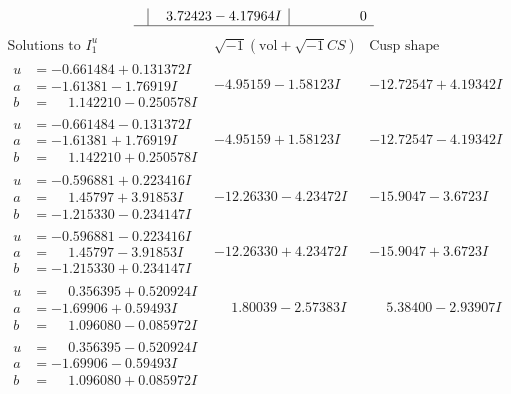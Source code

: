 \documentclass[1p]{elsarticle_modified}
\theoremstyle{definition}
\newcommand{\I}{\sqrt{-1}}
\begin{document}
$$\begin{array}{c|c|c}
 & \phantom{-}3.72423 - 4.17964 I & \phantom{-0.000000 } 0\\
 \hline 
 \end{array}$$\newpage$$\begin{array}{c|c|c}  
\text{Solutions to }I^u_{1}& \I (\text{vol} + \sqrt{-1}CS) & \text{Cusp shape}\\
 \hline 
\begin{aligned}
u &= -0.661484 + 0.131372 I \\
a &= -1.61381 - 1.76919 I \\
b &= \phantom{-}1.142210 - 0.250578 I\end{aligned}
 & -4.95159 - 1.58123 I & -12.72547 + 4.19342 I \\ \hline\begin{aligned}
u &= -0.661484 - 0.131372 I \\
a &= -1.61381 + 1.76919 I \\
b &= \phantom{-}1.142210 + 0.250578 I\end{aligned}
 & -4.95159 + 1.58123 I & -12.72547 - 4.19342 I \\ \hline\begin{aligned}
u &= -0.596881 + 0.223416 I \\
a &= \phantom{-}1.45797 + 3.91853 I \\
b &= -1.215330 - 0.234147 I\end{aligned}
 & -12.26330 - 4.23472 I & -15.9047 - 3.6723 I \\ \hline\begin{aligned}
u &= -0.596881 - 0.223416 I \\
a &= \phantom{-}1.45797 - 3.91853 I \\
b &= -1.215330 + 0.234147 I\end{aligned}
 & -12.26330 + 4.23472 I & -15.9047 + 3.6723 I \\ \hline\begin{aligned}
u &= \phantom{-}0.356395 + 0.520924 I \\
a &= -1.69906 + 0.59493 I \\
b &= \phantom{-}1.096080 - 0.085972 I\end{aligned}
 & \phantom{-}1.80039 - 2.57383 I & \phantom{-}5.38400 - 2.93907 I \\ \hline\begin{aligned}
u &= \phantom{-}0.356395 - 0.520924 I \\
a &= -1.69906 - 0.59493 I \\
b &= \phantom{-}1.096080 + 0.085972 I\end{aligned}

\end{array}$$
\end{document}
